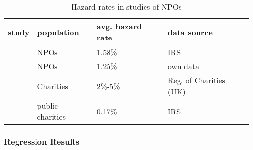 \documentclass[12pt]{article}
\begin{document}
\begin{table}[htbp]
\caption{\label{tbl:litreview2}Hazard rates in studies of NPOs}
\centering
\begin{tabular}{llll}
\hline
study & population & avg. hazard rate & data source\\
\hline
\cite{Gordon_etal_2013_insolvency} & NPOs & 1.58\% & IRS\\
\cite{Hager_Galaskiewicz_Larson_2007_liability} & NPOs & 1.25\% & own data\\
\cite{Clifford_2018_reinforcing} & Charities & 2\%-5\% & Reg. of Charities (UK)\\
\cite{Mayer_2022_simmer} & public charities & 0.17\% & IRS\\
\hline
\end{tabular}
\end{table}





\subsubsection*{Regression Results}
\end{document}
